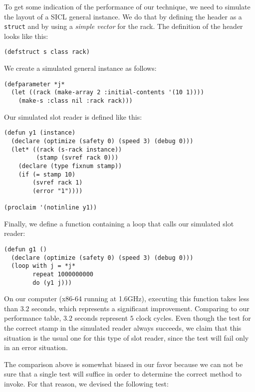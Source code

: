To get some indication of the performance of our technique, we need to
simulate the layout of a SICL general instance.  We do that by
defining the header as a \cl{} \texttt{struct} and by using a
\emph{simple vector} for the rack.  The definition of the header looks
like this:

{\small\begin{verbatim}
(defstruct s class rack)
\end{verbatim}}

We create a simulated general instance as follows:

{\small\begin{verbatim}
(defparameter *j* 
  (let ((rack (make-array 2 :initial-contents '(10 1))))
    (make-s :class nil :rack rack)))
\end{verbatim}}

Our simulated slot reader is defined like this:

{\small\begin{verbatim}
(defun y1 (instance)
  (declare (optimize (safety 0) (speed 3) (debug 0)))
  (let* ((rack (s-rack instance))
         (stamp (svref rack 0)))
    (declare (type fixnum stamp))
    (if (= stamp 10)
        (svref rack 1)
        (error "1"))))

(proclaim '(notinline y1))
\end{verbatim}}

Finally, we define a function containing a loop that calls our
simulated slot reader:

{\small\begin{verbatim}
(defun g1 ()
  (declare (optimize (safety 0) (speed 3) (debug 0)))
  (loop with j = *j*
        repeat 1000000000
        do (y1 j)))
\end{verbatim}}

On our computer (x86-64 running at 1.6GHz), executing this function
takes less than $3.2$ seconds, which represents a significant
improvement.  Comparing to our performance table, $3.2$ seconds represent $5$
clock cycles.  Even though the test for the correct stamp in the
simulated reader always succeeds, we claim that this situation is the
usual one for this type of slot reader, since the test will fail only
in an error situation. 

The comparison above is somewhat biased in our favor because we can
not be sure that a single test will suffice in order to determine the
correct method to invoke.  For that reason, we devised the following
test: 

